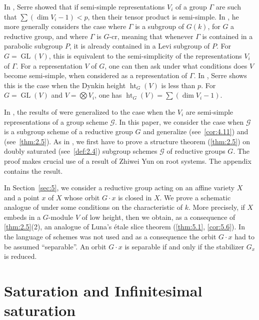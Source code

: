 \documentclass[11pt,a4paper]{article}
\theoremstyle{plain}
\theoremstyle{definition}
\DeclareMathOperator{\GL}{GL}
\DeclareMathOperator{\htG}{ht}
\begin{document}
In \cite{S1}, Serre showed that if semi-simple representations $V_i$ of a group $\Gamma$ are such that $\sum (\dim V_i - 1) < p$, then their tensor product is semi-simple. In \cite{S2}, he more generally considers the case where $\Gamma$ is a subgroup of $G(k)$, for $G$ a reductive group, and where $\Gamma$ is $G$-cr, meaning that whenever $\Gamma$ is contained in a parabolic subgroup $P$, it is already contained in a Levi subgroup of $P$. For $G = \GL(V)$, this is equivalent to the semi-simplicity of the representations $V_i$ of $\Gamma$. For a representation $V$ of $G$, one can then ask under what conditions does $V$ become semi-simple, when considered as a representation of $\Gamma$. In \cite[Theorem~6, page~25]{S2}, Serre shows this is the case when the Dynkin height $\htG_G(V)$ is less than $p$. For $G = \GL(V)$ and $V = \bigotimes V_i$, one has $\htG_G(V) = \sum (\dim V_i - 1)$.

In \cite{D}, the results of \cite{S1} were generalized to the case when the $V_i$ are semi-simple representations of a group scheme $\mathcal{G}$. In this paper, we consider the case when $\mathcal{G}$ is a subgroup scheme of a reductive group $G$ and generalize \cite{S2} (see~\ref{cor:4.11}) and \cite{D} (see~\ref{thm:2.5}). As in \cite{D}, we first have to prove a structure theorem (\ref{thm:2.5}) on doubly saturated (see~\ref{def:2.4}) subgroup schemes $\mathcal{G}$ of reductive groups $G$. The proof makes crucial use of a result of Zhiwei Yun on root systems. The appendix contains the result.

In Section~\ref{sec:5}, we consider a reductive group acting on an affine variety $X$ and a point $x$ of $X$ whose orbit $G \cdot x$ is closed in $X$. We prove a schematic analogue of \cite[Propositions~7.4, 7.6]{BR} under some conditions on the characteristic of $k$. More precisely, if $X$ embeds in a $G$-module $V$ of low height, then we obtain, as a consequence of \ref{thm:2.5}(2), an analogue of Luna's \'etale slice theorem (\ref{thm:5.1}, \ref{cor:5.6}). In \cite{BR} the language of schemes was not used and as a consequence the orbit $G \cdot x$ had to be assumed ``separable''. An orbit $G \cdot x$ is separable if and only if the stabilizer $G_x$ is reduced.


\section{Saturation and Infinitesimal saturation}
\label{sec:2}
\end{document}
